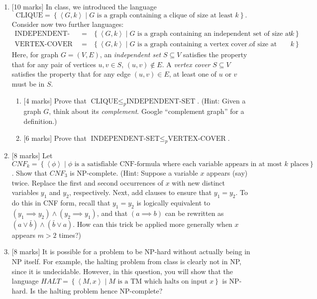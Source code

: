 \documentclass{article}
\newcommand{\class}[1]{\text{#1}}
\newcommand{\set}[1]{{\left\{#1\right\}}}    %
\newcommand{\enc}[1]{\left<#1\right>}
\begin{document}
\begin{enumerate}
    \item {[10 marks]} In class, we introduced the language
    \[
        \class{CLIQUE} = \set{\enc{G,k}\mid G\text{ is a graph containing a clique of size at least }k}.
    \]
    Consider now two further languages:
    \begin{eqnarray*}
        \class{INDEPENDENT-SET} &=& \set{\enc{G,k}\mid G\text{ is a graph containing an independent set of size at least }k}\\
        \class{VERTEX-COVER} &=& \set{\enc{G,k}\mid G\text{ is a graph containing a vertex cover of size at most }k}.
    \end{eqnarray*}
    Here, for graph $G=(V,E)$, an \emph{independent set} $S\subseteq V$ satisfies the property that for any pair of vertices $u,v\in S$, $(u,v)\not\in E$. A \emph{vertex cover} $S\subseteq V$ satisfies the property that for any edge $(u,v)\in E$, at least one of $u$ or $v$ must be in $S$.
    \begin{enumerate}
        \item {[4 marks]} Prove that $\class{CLIQUE}\leq_p\class{INDEPENDENT-SET}$. (Hint: Given a graph $G$, think about its \emph{complement}. Google ``complement graph'' for a definition.)
        \item {[6 marks]} Prove that $\class{INDEPENDENT-SET}\leq_p\class{VERTEX-COVER}$.
    \end{enumerate}
    \item {[8 marks]} Let $CNF_k=\set{\enc{\phi}\mid\phi\text{ is a satisfiable CNF-formula where each variable appears in at most }k\text{ places}}$. Show that ${CNF}_3$ is NP-complete. (Hint: Suppose a variable $x$ appears (say) twice. Replace the first and second occurrences of $x$ with new distinct variables $y_1$ and $y_2$, respectively. Next, add clauses to ensure that $y_1=y_2$. To do this in CNF form, recall that $y_1=y_2$ is logically equivalent to $(y_1\implies y_2)\wedge(y_2\implies y_1)$, and that $(a\implies b)$ can be rewritten as $(a\vee \bar{b})\wedge (\bar{b}\vee {a})$. How can this trick be applied more generally when $x$ appears $m>2$ times?)
    
    \item {[8 marks]} It is possible for a problem to be NP-hard without actually being in NP itself. For example, the halting problem from class is clearly not in NP, since it is undecidable. However, in this question, you will show that the language $HALT=\set{\enc{M,x}\mid M\text{ is a TM which halts on input }x}$ is NP-hard. Is the halting problem hence NP-complete?
    

\end{enumerate}
\end{document}
